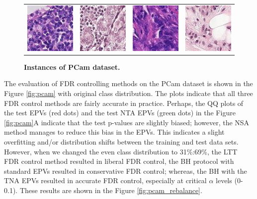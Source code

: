 \documentclass{article}
\begin{document}
\begin{figure}
	\centering
	\begin{tabular}{cccc}
 		\includegraphics[width=1.7in]{img/pcam1.jpg} &
		\includegraphics[width=1.7in]{img/pcam2.jpg} & 
            \includegraphics[width=1.7in]{img/pcam3.jpg} &
             \includegraphics[width=1.7in]{img/pcam4.jpg}
        \end{tabular}
	\caption{{\bf Instances of PCam dataset.}}
	\label{fig:pcam_example}
\end{figure} 


The evaluation of FDR controlling methods on the PCam dataset is shown in the Figure \ref{fig:pcam} with original class distribution. The plots indicate that all three FDR control methods are fairly accurate in practice. Perhaps, the QQ plots of the test EPVs (red dots) and the test NTA EPVs (green dots) in the Figure \ref{fig:pcam}A indicate that the test p-values are slightly biased; however, the NSA method manages to reduce this bias in the EPVs. This indicates a slight overfitting and/or distribution shifts between the training and test data sets. However, when we changed the even class distribution to 31\%:69\%, the LTT FDR control method resulted in liberal FDR control, the BH protocol with standard EPVs resulted in conservative FDR control; whereas, the BH with the TNA EPVs resulted in accurate FDR control,  especially at critical $\alpha$ levels (0-0.1). These results are shown in the Figure \ref{fig:pcam_rebalance}.
\end{document}
